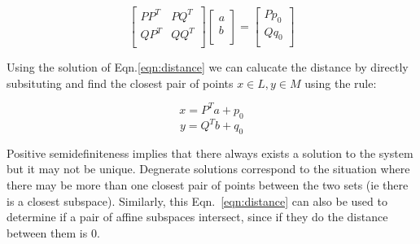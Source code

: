 \documentclass{article}[11pt]
\begin{document}
\begin{equation}
\label{eqn:distance}
\left [ \begin{array}{cc}
P P^T & P Q^T \\
Q P^T & Q Q^T \\
\end{array} \right ]
\left [ \begin{array}{c}
a \\
b \\
\end{array} \right ] = 
\left [ \begin{array}{c}
P p_0 \\
Q q_0 \\
\end{array} \right ]
\end{equation}

Using the solution of Eqn.\ref{eqn:distance} we can calucate the distance by directly subsituting and find the closest pair of points $x \in L, y \in M$  using the rule:

\[ x = P^T a + p_0 \]
\[ y = Q^T b + q_0 \]

Positive semidefiniteness implies that there always exists a solution to the system but it may not be unique.  Degnerate solutions correspond to the situation where there may be more than one closest pair of points between the two sets (ie there is a closest subspace).  Similarly, this Eqn.~\ref{eqn:distance} can also be used to determine if a pair of affine subspaces intersect, since if they do the distance between them is 0.
\end{document}
